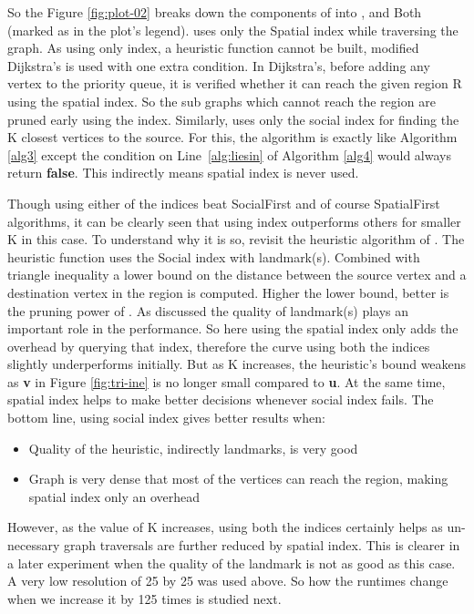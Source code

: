 So the Figure \ref{fig:plot-02} breaks down the components of {\rrp} into {\rrpspatial}, {\rrpsocial} and Both (marked as {\rrp} in the plot's legend). {\rrpspatial} uses only the Spatial index while traversing the graph. As using only {\rrpspatial} index, a heuristic function cannot be built, modified Dijkstra's is used with one extra condition. In Dijkstra's, before adding any vertex to the priority queue, it is verified whether it can reach the given region R using the spatial index. So the sub graphs which cannot reach the region are pruned early using the index. Similarly, {\rrpsocial} uses only the social index for finding the K closest vertices to the source. For this, the algorithm is exactly like Algorithm \ref{alg3} except the condition on Line~\ref{alg:liesin} of Algorithm \ref{alg4} would always return \textbf{false}. This indirectly means spatial index is never used.

Though using either of the indices beat SocialFirst and of course SpatialFirst algorithms, it can be clearly seen that using {\rrpsocial} index outperforms others for smaller K in this case. To understand why it is so, revisit the heuristic algorithm of {\rrp}. The heuristic function uses the Social index with landmark(s). Combined with triangle inequality a lower bound on the distance between the source vertex and a destination vertex in the region is computed. Higher the lower bound, better is the pruning power of {\rrp}. As discussed the quality of landmark(s) plays an important role in the performance. So here using the spatial index only adds the overhead by querying that index, therefore the curve using both the indices slightly underperforms initially. But as K increases, the heuristic’s bound weakens as \textbf{v} in Figure \ref{fig:tri-ine} is no longer small compared to \textbf{u}. At the same time, spatial index helps {\rrp} to make better decisions whenever social index fails. The bottom line, using social index gives better results when:
\begin{itemize}
  \item Quality of the heuristic, indirectly landmarks, is very good
  \item Graph is very dense that most of the vertices can reach the region, making spatial index only an overhead
\end{itemize}

However, as the value of K increases, using both the indices certainly helps as un-necessary graph traversals are further reduced by spatial index. This is clearer in a later experiment when the quality of the landmark is not as good as this case. A very low resolution of 25 by 25 was used above. So how the runtimes change when we increase it by 125 times is studied next.

